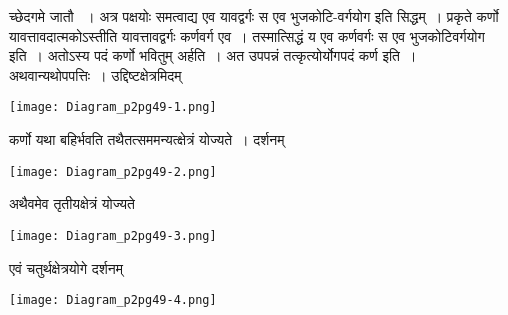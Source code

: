 \documentclass[11pt, openany]{book}
\begin{document}
\newpage

\begin{sloppypar}
\noindent च्छेदगमे जातौ ~। अत्र पक्षयोः समत्वाद्य एव यावद्वर्गः स एव भुजकोटि-वर्गयोग इति सिद्धम्~। प्रकृते कर्णो यावत्तावदात्मकोऽस्तीति यावत्तावद्वर्गः कर्णवर्ग एव~। तस्मात्सिद्धं य एव कर्णवर्गः स एव भुजकोटिवर्गयोग इति~। अतोऽस्य पदं कर्णो भवितुम् अर्हति~। अत उपपन्नं तत्कृत्योर्योगपदं कर्ण इति~। \\

अथवान्यथोपपत्तिः~। उद्दिष्टक्षेत्रमिदम्

\begin{center}
    \texttt{[image: Diagram\_p2pg49-1.png]}
\end{center}

कर्णो यथा बहिर्भवति तथैतत्सममन्यत्क्षेत्रं योज्यते~। दर्शनम्

\begin{center}
    \texttt{[image: Diagram\_p2pg49-2.png]}
\end{center}

अथैवमेव तृतीयक्षेत्रं योज्यते

\begin{center}
    \texttt{[image: Diagram\_p2pg49-3.png]}
\end{center}

एवं चतुर्थक्षेत्रयोगे दर्शनम्

\begin{center}
    \texttt{[image: Diagram\_p2pg49-4.png]}
\end{center}
\end{sloppypar}

\newpage
\end{document}

